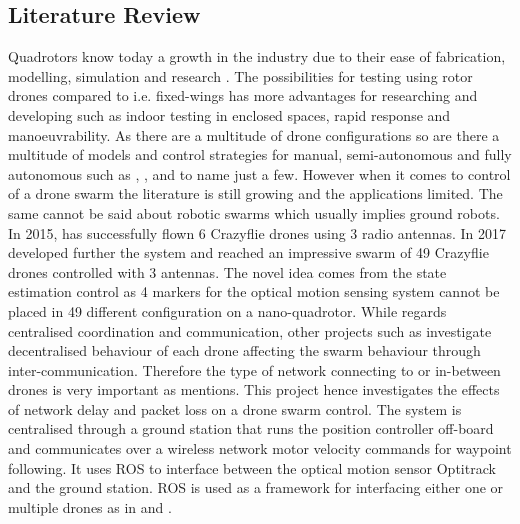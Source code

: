 \subsection{Literature Review}

Quadrotors know today a growth in the industry due to their ease of fabrication, modelling, simulation and research \cite{modellingcrazy}. The possibilities for testing using rotor drones compared to i.e. fixed-wings has more advantages for researching and developing such as indoor testing in enclosed spaces, rapid response and manoeuvrability. As there are a multitude of drone configurations so are there a multitude of models and control strategies for manual, semi-autonomous and fully autonomous such as \cite{modellingcrazy}, \cite{beard_quadrotor}, \cite{beard2012small} and \cite{corke2017robotics} to name just a few. However when it comes to control of a drone swarm the literature is still growing and the applications limited. The same cannot be said about robotic swarms which usually implies ground robots. In 2015, \cite{swarm_1} has successfully flown 6 Crazyflie drones using 3 radio antennas. In 2017 \cite{preiss2017crazyswarm} developed further the system and reached an impressive swarm of 49 Crazyflie drones controlled with 3 antennas. The novel idea comes from the state estimation control as 4 markers for the optical motion sensing system cannot be placed in 49 different configuration on a nano-quadrotor. While \cite{preiss2017crazyswarm} regards centralised coordination and communication, other projects such as \cite{chaumette2011carus} investigate decentralised behaviour of each drone affecting the swarm behaviour through inter-communication. Therefore the type of network connecting to or in-between drones is very important as \cite{yanmaz2018drone} mentions. This project hence investigates the effects of network delay and packet loss on a drone swarm control. The system is centralised through a ground station that runs the position controller off-board and communicates over a wireless network motor velocity commands for waypoint following. It uses ROS to interface between the optical motion sensor Optitrack and the ground station. ROS is used as a framework for interfacing either one or multiple drones as in \cite{HoenigMixedReality2015} and \cite{educationalresearch}.